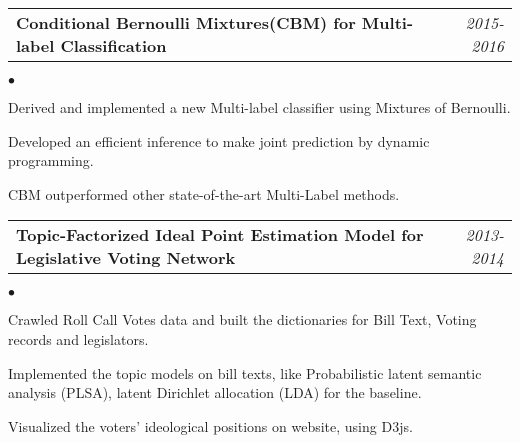 \documentclass[11pt]{article}
\makeatletter
\newenvironment{achievements}{\begin{list}{$\bullet$}{\topsep 0pt \itemsep -2pt}}{\vspace*{4pt}\end{list}}
\newcommand{\headerrow}[2]
{\begin{tabular*}{\linewidth}{l@{\extracolsep{\fill}}r}
	\hspace*{-15pt}#1 & #2 \\
\end{tabular*}}
\makeatother
\begin{document}
\newpage

\headerrow
{\textbf{Conditional Bernoulli Mixtures(CBM) for Multi-label Classification}}
{\emph{2015-2016}}
\begin{achievements}
	\item Derived and implemented a new Multi-label classifier using Mixtures of Bernoulli.
	\item Developed an efficient inference to make joint prediction by dynamic programming.
	\item CBM outperformed other state-of-the-art Multi-Label methods.
\end{achievements}

\headerrow
{\textbf{Topic-Factorized Ideal Point Estimation Model for Legislative Voting Network}}
{\emph{2013-2014}}
\begin{achievements}
	\item Crawled Roll Call Votes data and built the dictionaries for Bill Text, Voting records and legislators.
	\item Implemented the topic models on bill texts, like Probabilistic latent semantic analysis (PLSA),  latent Dirichlet allocation (LDA) for the baseline.
	\item Visualized the voters' ideological positions on website, using D3js. 
\end{achievements}



\end{document}
